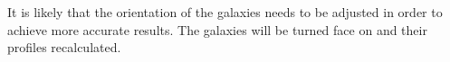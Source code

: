 \documentclass[linenumbers,trackchanges]{aastex7}
\begin{document}
It is likely that the orientation of the galaxies needs to be adjusted
in order to achieve more accurate results. The galaxies will be turned
face on and their profiles recalculated.


{}



\end{document}
